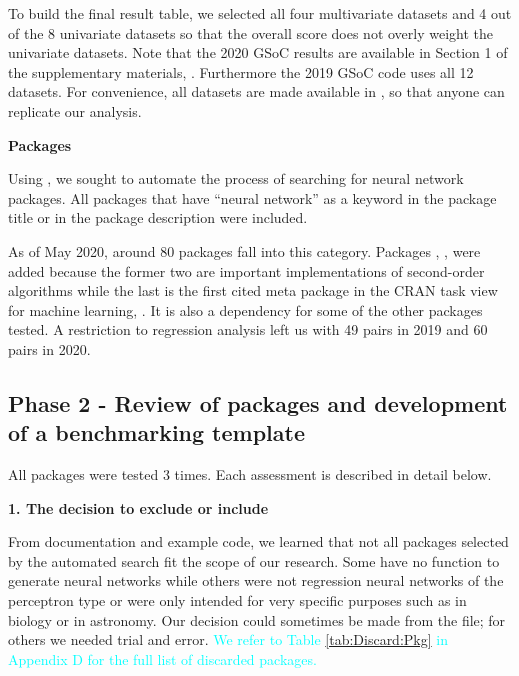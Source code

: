 To build the final result table, we selected all four multivariate
datasets and 4 out of the 8 univariate datasets so that the overall
score does not overly weight the univariate datasets. Note that the 2020
GSoC results are available in Section 1 of the supplementary materials,
\citep{suppl:material:paper21}. Furthermore the 2019 GSoC code uses all
12 datasets. For convenience, all datasets are made available in
, so that anyone can replicate our analysis.

\textbf{Packages}

Using  \citep{R-RWsearch}, we sought to automate the
process of searching for neural network packages. All packages that have
``neural network'' as a keyword in the package title or in the package
description were included.

As of May 2020, around 80 packages fall into this category. Packages
, ,  were added because
the former two are important implementations of second-order algorithms
while the last is the first cited meta package in the CRAN task view for
machine learning, . It is also a dependency for
some of the other packages tested. A restriction to regression analysis
left us with 49  pairs in 2019 and 60
 pairs in 2020.

\hypertarget{phase-2---review-of-packages-and-development-of-a-benchmarking-template}{%
\subsection{Phase 2 - Review of packages and development of a
benchmarking
template}\label{phase-2---review-of-packages-and-development-of-a-benchmarking-template}}

All packages were tested 3 times. Each assessment is described in detail
below.

\textbf{1. The decision to exclude or include}

From documentation and example code, we learned that not all packages
selected by the automated search fit the scope of our research. Some
have no function to generate neural networks while others were not
regression neural networks of the perceptron type or were only intended
for very specific purposes such as in biology or in astronomy. Our
decision could sometimes be made from the  file; for
others we needed trial and error.
\textcolor{cyan}{We refer to Table \ref{tab:Discard:Pkg} in Appendix D for the full list of discarded packages.}

